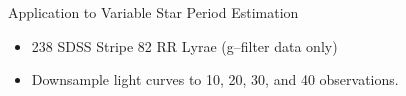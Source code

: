 \documentclass[12pt]{beamer}
\begin{document}
\begin{frame}{Application to Variable Star Period Estimation}
\begin{itemize}
\item 238 SDSS Stripe 82 RR Lyrae (g--filter data only)
\item Downsample light curves to 10, 20, 30, and 40 observations.

\def \tw {.15}
  




\end{itemize}
\end{frame}
\end{document}

